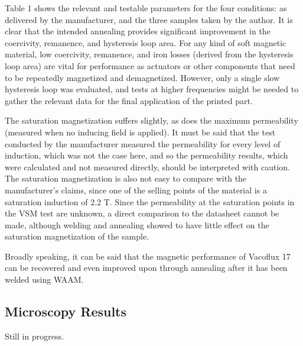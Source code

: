 Table 1 shows the relevant and testable parameters for the four conditions: as delivered by the manufacturer, and the three samples taken by the author. It is clear that the intended annealing provides significant improvement in the coercivity, remanence, and hysteresis loop area. For any kind of soft magnetic material, low coercivity, remanence, and iron losses (derived from the hysteresis loop area) are vital for performance as actuators or other components that need to be repeatedly magnetized and demagnetized. However, only a single slow hysteresis loop was evaluated, and tests at higher frequencies might be needed to gather the relevant data for the final application of the printed part.

The saturation magnetization suffers slightly, as does the maximum permeability (measured when no inducing field is applied). It must be said that the test conducted by the manufacturer measured the permeability for every level of induction, which was not the case here, and so the permeability results, which were calculated and not measured directly, should be interpreted with caution. The saturation magnetization is also not easy to compare with the manufacturer's claims, since one of the selling points of the material is a saturation induction of 2.2 T. Since the permeability at the saturation points in the VSM test are unknown, a direct comparison to the datasheet cannot be made, although welding and annealing showed to have little effect on the saturation magnetization of the sample. 

Broadly speaking, it can be said that the magnetic performance of Vacoflux 17 can be recovered and even improved upon through annealing after it has been welded using WAAM.

\subsection{Microscopy Results}

Still in progress.